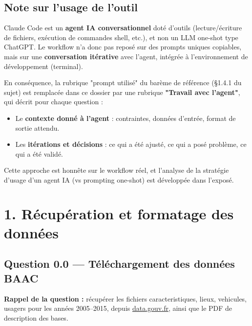 \documentclass[11pt,a4paper]{article}
\newcommand{\rub}[2]{\textbf{\textcolor{#1}{#2}}}
\begin{document}
\subsection*{Note sur l'usage de l'outil}

Claude Code est un \textbf{agent IA conversationnel} doté d'outils (lecture/écriture de fichiers, exécution de commandes shell, etc.), et non un LLM one-shot type ChatGPT. Le workflow n'a donc pas reposé sur des prompts uniques copiables, mais sur une \textbf{conversation itérative} avec l'agent, intégrée à l'environnement de développement (terminal).

En conséquence, la rubrique "prompt utilisé" du barème de référence (§1.4.1 du sujet) est remplacée dans ce dossier par une rubrique \textbf{"Travail avec l'agent"}, qui décrit pour chaque question :

\begin{itemize}
\item Le \textbf{contexte donné à l'agent} : contraintes, données d'entrée, format de sortie attendu.
\item Les \textbf{itérations et décisions} : ce qui a été ajusté, ce qui a posé problème, ce qui a été validé.
\end{itemize}

Cette approche est honnête sur le workflow réel, et l'analyse de la stratégie d'usage d'un agent IA (vs prompting one-shot) est développée dans l'exposé.

\tableofcontents
\newpage

\section*{1. Récupération et formatage des données}

\clearpage
\subsection*{Question 0.0 — Téléchargement des données BAAC}

\rub{labrappel}{Rappel de la question :} récupérer les fichiers caracteristiques, lieux, vehicules, usagers pour les années 2005–2015, depuis \href{https://www.data.gouv.fr/fr/datasets/base-de-donnees-accidents-corporels-de-la-circulation/}{data.gouv.fr}, ainsi que le PDF de description des bases.
\end{document}
